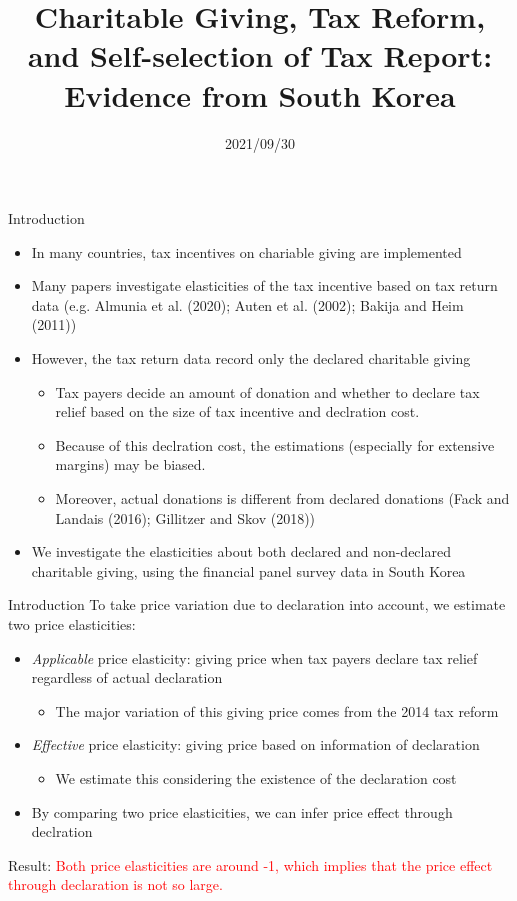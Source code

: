 \documentclass[
  ignorenonframetext,
  aspectratio=169,
]{beamer}
\title{Charitable Giving, Tax Reform, and Self-selection of Tax Report: Evidence from South Korea  }
\author[shortname]{ Hiroki Kato \inst{1} \and  Tsuyoshi Goto \inst{2} \and  Yong-Rok Kim \inst{3} \and }
\institute[shortinst]{ \inst{1} Osaka University \and  \inst{2} Chiba University \and  \inst{3} Kobe University \and }
\date{2021/09/30}
\providecommand{\tightlist}{%
  \setlength{\itemsep}{0pt}\setlength{\parskip}{0pt}}
\begin{document}
\frame{\titlepage}

\begin{frame}{Introduction}
\protect\hypertarget{introduction}{}
\begin{itemize}
\tightlist
\item
  In many countries, tax incentives on chariable giving are implemented
\item
  Many papers investigate elasticities of the tax incentive based on tax return data (e.g. Almunia et al. (2020); Auten et al. (2002); Bakija and Heim (2011))
\item
  However, the tax return data record only the declared charitable giving

  \begin{itemize}
  \tightlist
  \item
    Tax payers decide an amount of donation and whether to declare tax relief based on the size of tax incentive and declration cost.
  \item
    Because of this declration cost, the estimations (especially for extensive margins) may be biased.
  \item
    Moreover, actual donations is different from declared donations (Fack and Landais (2016); Gillitzer and Skov (2018))
  \end{itemize}
\item
  We investigate the elasticities about both declared and non-declared charitable giving, using the financial panel survey data in South Korea
\end{itemize}
\end{frame}

\begin{frame}{Introduction}
\protect\hypertarget{introduction-1}{}
To take price variation due to declaration into account, we estimate two price elasticities:

\begin{itemize}
\tightlist
\item
  \emph{Applicable} price elasticity: giving price when tax payers declare tax relief regardless of actual declaration

  \begin{itemize}
  \tightlist
  \item
    The major variation of this giving price comes from the 2014 tax reform
  \end{itemize}
\item
  \emph{Effective} price elasticity: giving price based on information of declaration

  \begin{itemize}
  \tightlist
  \item
    We estimate this considering the existence of the declaration cost
  \end{itemize}
\item
  By comparing two price elasticities, we can infer price effect through declration
\end{itemize}

Result: \textcolor{red}{Both price elasticities are around -1, which implies that the price effect through declaration is not so large.}
\end{frame}
\end{document}
